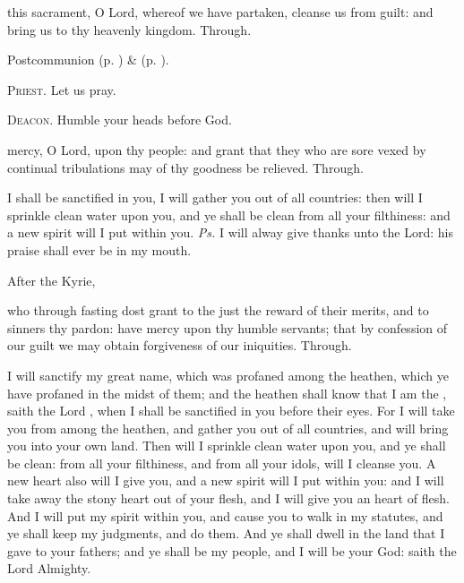 
\postcommunion
{} this sacrament, O Lord, whereof we have partaken, cleanse us from guilt: and bring us to thy heavenly kingdom. Through.


\begin{rubric}
     Postcommunion  (p. \pageref{AshWednesdayMassPostcommunion}) \&   (p. \pageref{SPLivingDeparted}).
\end{rubric}

\textsc{Priest.} Let us pray.\par
\textsc{Deacon.} Humble your heads before God.\par
{} mercy, O Lord, upon thy people: and grant that they who are sore vexed by continual tribulations may of thy goodness be relieved. Through.


\introit
{} I shall be sanctified in you, I will gather you out of all countries: then will I sprinkle clean water upon you, and ye shall be clean from all your filthiness: and a new spirit will I put within you. \textit{Ps.} I will alway give thanks unto the Lord: his praise shall ever be in my mouth.

\begin{rubric}
    After the Kyrie,
\end{rubric}

\collect
{} who through fasting dost grant to the just the reward of their merits, and to sinners thy pardon: have mercy upon thy humble servants; that by confession of our guilt we may obtain forgiveness of our iniquities. Through.

 I will sanctify my great name, which was profaned among the heathen, which ye have profaned in the midst of them; and the heathen shall know that I am the , saith the Lord , when I shall be sanctified in you before their eyes. For I will take you from among the heathen, and gather you out of all countries, and will bring you into your own land. Then will I sprinkle clean water upon you, and ye shall be clean: from all your filthiness, and from all your idols, will I cleanse you. A new heart also will I give you, and a new spirit will I put within you: and I will take away the stony heart out of your flesh, and I will give you an heart of flesh. And I will put my spirit within you, and cause you to walk in my statutes, and ye shall keep my judgments, and do them. And ye shall dwell in the land that I gave to your fathers; and ye shall be my people, and I will be your God: saith the Lord Almighty.

